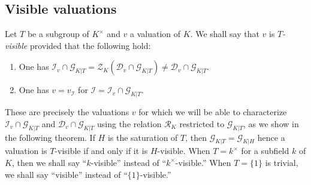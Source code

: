 \documentclass[12pt]{amsart}
\newcommand{\Zcal}{\mathcal{Z}}
\newcommand{\Gcal}{\mathcal{G}}
\newcommand{\Rcal}{\mathcal{R}}
\newcommand{\Dcal}{\mathcal{D}}
\newcommand{\Ical}{\mathcal{I}}
\theoremstyle{definition}
\begin{document}
\subsection{Visible valuations}

Let $T$ be a subgroup of $K^{\times}$ and $v$ a valuation of $K$.
We shall say that $v$ is \emph{$T$-visible} provided that the following hold:
\begin{enumerate}
  \item One has $\Ical_{v} \cap \Gcal_{K|T} = \Zcal_{K}(\Dcal_{v} \cap \Gcal_{K|T}) \neq \Dcal_{v} \cap \Gcal_{K|T}$.
  \item One has $v = v_{\Ical}$ for $\Ical = \Ical_{v} \cap \Gcal_{K|T}$.
\end{enumerate}
These are precisely the valuations $v$ for which we will be able to characterize $\Ical_{v} \cap \Gcal_{K|T}$ and $\Dcal_{v} \cap \Gcal_{K|T}$ using the relation $\Rcal_{K}$ restricted to $\Gcal_{K|T}$, as we show in the following theorem.
If $H$ is the saturation of $T$, then $\Gcal_{K|T} = \Gcal_{K|H}$ hence a valuation is $T$-visible if and only if it is $H$-visible.
When $T = k^{\times}$ for a subfield $k$ of $K$, then we shall say ``$k$-visible'' instead of ``$k^{\times}$-visible.''
When $T = \{1\}$ is trivial, we shall say ``visible'' instead of ``$\{1\}$-visible.''
\end{document}
